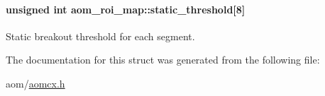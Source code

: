 \paragraph[{\texorpdfstring{static\+\_\+threshold}{static_threshold}}]{\setlength{\rightskip}{0pt plus 5cm}unsigned int aom\+\_\+roi\+\_\+map\+::static\+\_\+threshold\mbox{[}8\mbox{]}}\hypertarget{structaom__roi__map_a68f795675cf54a123c89e2f9dda9063f}{}\label{structaom__roi__map_a68f795675cf54a123c89e2f9dda9063f}
Static breakout threshold for each segment. 

The documentation for this struct was generated from the following file\+:\begin{DoxyCompactItemize}
\item 
aom/\hyperlink{aomcx_8h}{aomcx.\+h}\end{DoxyCompactItemize}
